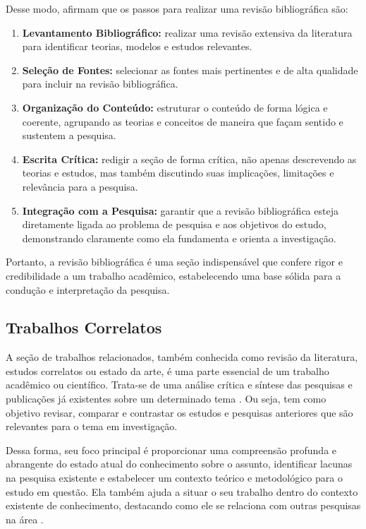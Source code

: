 Desse modo,  afirmam que os passos para realizar uma revisão bibliográfica são:
\begin{enumerate}[label=\roman*., nosep, leftmargin=2.5cm]
    \item \textbf{Levantamento Bibliográfico:} realizar uma revisão extensiva da literatura para identificar teorias, modelos e estudos relevantes.
    \item \textbf{Seleção de Fontes:} selecionar as fontes mais pertinentes e de alta qualidade para incluir na revisão bibliográfica.
    \item \textbf{Organização do Conteúdo:} estruturar o conteúdo de forma lógica e coerente, agrupando as teorias e conceitos de maneira que façam sentido e sustentem a pesquisa.
    \item \textbf{Escrita Crítica:} redigir a seção de forma crítica, não apenas descrevendo as teorias e estudos, mas também discutindo suas implicações, limitações e relevância para a pesquisa.
    \item \textbf{Integração com a Pesquisa:} garantir que a revisão bibliográfica esteja diretamente ligada ao problema de pesquisa e aos objetivos do estudo, demonstrando claramente como ela fundamenta e orienta a investigação.
\end{enumerate}

Portanto, a revisão bibliográfica é uma seção indispensável que confere rigor e credibilidade a um trabalho acadêmico, estabelecendo uma base sólida para a condução e interpretação da pesquisa.

\subsection{Trabalhos Correlatos}

A seção de trabalhos relacionados, também conhecida como revisão da literatura, estudos correlatos ou estado da arte, é uma parte essencial de um trabalho acadêmico ou científico. Trata-se de uma análise crítica e síntese das pesquisas e publicações já existentes sobre um determinado tema \cite{Marconi2021}. Ou seja, tem como objetivo revisar, comparar e contrastar os estudos e pesquisas anteriores que são relevantes para o tema em investigação.

Dessa forma, seu foco principal é proporcionar uma compreensão profunda e abrangente do estado atual do conhecimento sobre o assunto, identificar lacunas na pesquisa existente e estabelecer um contexto teórico e metodológico para o estudo em questão. Ela também ajuda a situar o seu trabalho dentro do contexto existente de conhecimento, destacando como ele se relaciona com outras pesquisas na área \cite{Wazlawick2021}.


